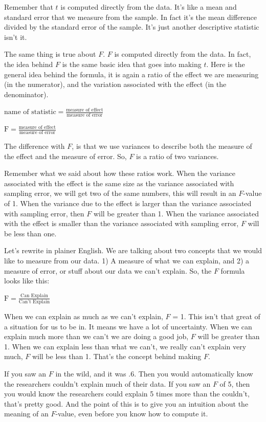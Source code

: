 \documentclass[
  letterpaper,
  DIV=11,
  numbers=noendperiod]{scrreprt}
\begin{document}
Remember that \(t\) is computed directly from the data. It's like a mean
and standard error that we measure from the sample. In fact it's the
mean difference divided by the standard error of the sample. It's just
another descriptive statistic isn't it.

The same thing is true about \(F\). \(F\) is computed directly from the
data. In fact, the idea behind \(F\) is the same basic idea that goes
into making \(t\). Here is the general idea behind the formula, it is
again a ratio of the effect we are measuring (in the numerator), and the
variation associated with the effect (in the denominator).

\(\text{name of statistic} = \frac{\text{measure of effect}}{\text{measure of error}}\)

\(\text{F} = \frac{\text{measure of effect}}{\text{measure of error}}\)

The difference with \(F\), is that we use variances to describe both the
measure of the effect and the measure of error. So, \(F\) is a ratio of
two variances.

Remember what we said about how these ratios work. When the variance
associated with the effect is the same size as the variance associated
with sampling error, we will get two of the same numbers, this will
result in an \(F\)-value of 1. When the variance due to the effect is
larger than the variance associated with sampling error, then \(F\) will
be greater than 1. When the variance associated with the effect is
smaller than the variance associated with sampling error, \(F\) will be
less than one.

Let's rewrite in plainer English. We are talking about two concepts that
we would like to measure from our data. 1) A measure of what we can
explain, and 2) a measure of error, or stuff about our data we can't
explain. So, the \(F\) formula looks like this:

\(\text{F} = \frac{\text{Can Explain}}{\text{Can't Explain}}\)

When we can explain as much as we can't explain, \(F\) = 1. This isn't
that great of a situation for us to be in. It means we have a lot of
uncertainty. When we can explain much more than we can't we are doing a
good job, \(F\) will be greater than 1. When we can explain less than
what we can't, we really can't explain very much, \(F\) will be less
than 1. That's the concept behind making \(F\).

If you saw an \(F\) in the wild, and it was .6. Then you would
automatically know the researchers couldn't explain much of their data.
If you saw an \(F\) of 5, then you would know the researchers could
explain 5 times more than the couldn't, that's pretty good. And the
point of this is to give you an intuition about the meaning of an
\(F\)-value, even before you know how to compute it.
\end{document}
